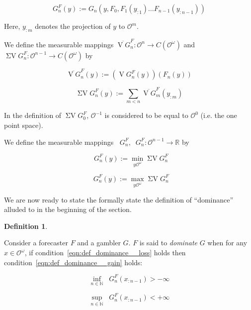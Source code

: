 \documentclass[11pt]{article}
\theoremstyle{definition}
\newtheorem{definition}{Definition}%
\theoremstyle{plain}
\newcommand{\Nats}{\mathbb{N}}
\newcommand{\Reals}{\mathbb{R}}
\newcommand{\Ob}{\mathcal{O}}
\newcommand{\OO}{\Ob^\omega}
\newcommand{\CO}{C(\OO)}
\DeclareMathOperator{\V}{V}
\DeclareMathOperator{\SV}{\Sigma V}
\DeclareMathOperator{\SVM}{\Sigma V_{\min}}
\DeclareMathOperator{\SVX}{\Sigma V_{\max}}
\begin{document}
\begin{equation}
\label{eqn:GF}
G^F_n(y):=G_n(y,F_0,F_1(y_{:1}) \ldots F_{n-1}(y_{:n-1}))
\end{equation}

Here, $y_{:m}$ denotes the projection of $y$ to $\Ob^m$.

We define the measurable mappings $\overline{\V G}^F_n: \Ob^n \rightarrow \CO$ and $\SV G^F_n: \Ob^{n-1} \rightarrow \CO$ by

\begin{equation}
\overline{\V G}^F_n(y):=(\V G^F_n(y))(F_n(y))
\end{equation}

\begin{equation}
\SV G^F_n(y) := \sum_{m < n} \overline{\V G}^F_m(y_{:m})
\end{equation}

In the definition of $\SV G^F_0$, $\Ob^{-1}$ is considered to be equal to $\Ob^0$ (i.e. the one point space).

We define the measurable mappings $\SVM G^F_n, \SVX G^F_n: \Ob^{n-1} \rightarrow \Reals$ by

\begin{equation}
\SVM G^F_n(y):=\min_{y\OO} \SV G^F_n
\end{equation}

\begin{equation}
\SVX G^F_n(y):=\max_{y\OO} \SV G^F_n
\end{equation}

We are now ready to state the formally state the definition of \enquote{dominance} alluded to in the beginning of the section.

\begin{definition}
\label{def:dominance}

Consider a forecaster $F$ and a gambler $G$. $F$ is said to \emph{dominate} $G$ when for any $x \in \OO$, if condition~\ref{eqn:def_dominance__loss} holds then condition~\ref{eqn:def_dominance__gain} holds:

\begin{equation}
\label{eqn:def_dominance__loss}
\inf_{n \in \Nats} {\SVM G^F_{n}(x_{:n-1})} > -\infty
\end{equation}

\begin{equation}
\label{eqn:def_dominance__gain}
\sup_{n \in \Nats} {\SVX G^F_{n}(x_{:n-1})} < +\infty
\end{equation}

\end{definition}
\end{document}
